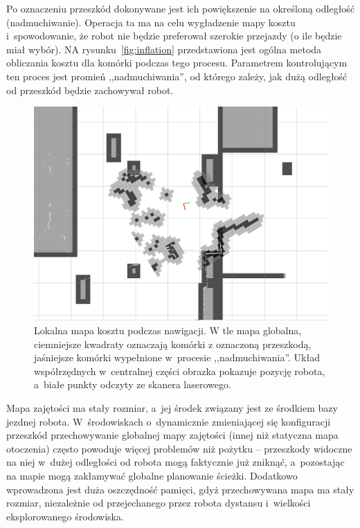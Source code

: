 Po oznaczeniu przeszkód dokonywane jest ich powiększenie na określoną odległość
(nadmuchiwanie). Operacja ta ma na celu wygładzenie mapy kosztu i~spowodowanie,
że robot nie będzie preferował szerokie przejazdy (o ile będzie miał wybór). NA
rysunku~\ref{fig:inflation} przedstawiona jest ogólna metoda obliczania kosztu
dla komórki podczas tego procesu. Parametrem kontrolującym ten proces jest
promień ,,nadmuchiwania'', od którego zależy, jak dużą odległość od
przeszkód będzie zachowywał robot.

\begin{figure}[htb!]
\centering
\includegraphics[width=13cm]{../img/costmap}
\caption[Mapa kosztu]{Lokalna mapa kosztu podczas nawigacji. W tle mapa globalna, ciemniejsze
kwadraty oznaczają komórki z oznaczoną przeszkodą, jaśniejsze komórki wypełnione
w~procesie ,,nadmuchiwania''. Układ współrzędnych w~centralnej części obrazka pokazuje
pozycję robota, a~białe punkty odczyty ze skanera laserowego.}
\label{fig:costmap}
\end{figure}

Mapa zajętości ma stały rozmiar, a~jej środek związany jest ze środkiem bazy
jezdnej robota. W~środowiskach o~dynamicznie zmieniającej się konfiguracji
przeszkód przechowywanie globalnej mapy zajętości (innej niż statyczna mapa
otoczenia) często powoduje więcej problemów niż pożytku -- przeszkody widoczne
na niej w~dużej odległości od robota mogą faktycznie już zniknąć, a~pozostając
na mapie mogą zakłamywać globalne planowanie ścieżki. Dodatkowo wprowadzona jest
duża oszczędność pamięci, gdyż przechowywana mapa ma stały rozmiar, niezależnie
od przejechanego przez robota dystansu i~wielkości eksplorowanego środowiska.

